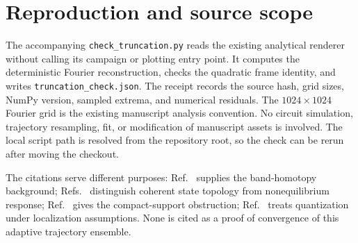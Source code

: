 \documentclass[aps,prb,onecolumn,nofootinbib,superscriptaddress]{revtex4-2}
\begin{document}
\appendix
\section{Reproduction and source scope}
The accompanying \texttt{check\_truncation.py} reads the existing analytical renderer  without calling its campaign or plotting entry point. It computes the deterministic Fourier reconstruction, checks the quadratic frame identity, and writes \texttt{truncation\_check.json}. The receipt records the source hash, grid sizes, NumPy version, sampled extrema, and numerical residuals. The $1024\times1024$ Fourier grid is the existing manuscript analysis convention. No circuit simulation, trajectory resampling, fit, or modification of manuscript assets is involved. The local script path is resolved from the repository root, so the check can be rerun after moving the checkout.

The citations serve different purposes: Ref.~\cite{Avron1983} supplies the band-homotopy background; Refs.~\cite{Caio2015,Caio2016} distinguish coherent state topology from nonequilibrium response; Ref.~\cite{DubailRead2015} gives the compact-support obstruction; Ref.~\cite{Bellissard1994} treats quantization under localization assumptions. None is cited as a proof of convergence of this adaptive trajectory ensemble.


\end{document}
